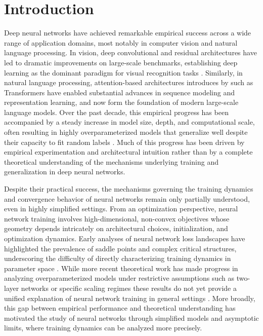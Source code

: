 \chapter{Introduction}\label{cha:intro}

Deep neural networks have achieved remarkable empirical success across a wide
range of application domains, most notably in computer vision and natural
language processing. In vision, deep convolutional and residual architectures
have led to dramatic improvements on large-scale benchmarks, establishing deep
learning as the dominant paradigm for visual recognition tasks
\citep{krizhevsky2012imagenet, he2016deep}. Similarly, in natural language
processing, attention-based architectures introduces by
\citet{vaswani2023attentionneed} such as Transformers have enabled substantial
advances in sequence modeling and representation learning, and now form the
foundation of modern large-scale language models. Over the past decade, this
empirical progress has been accompanied by a steady increase in model size,
depth, and computational scale, often resulting in highly overparameterized
models that generalize well despite their capacity to fit random labels
\citep{zhang2017understandingdeeplearningrequires, Belkin_2019}. Much of this
progress has been driven by empirical experimentation and architectural
intuition rather than by a complete theoretical understanding of the mechanisms
underlying training and generalization in deep neural networks.

Despite their practical success, the mechanisms governing the training dynamics
and convergence behavior of neural networks remain only partially understood,
even in highly simplified settings. From an optimization perspective, neural
network training involves high-dimensional, non-convex objectives whose
geometry depends intricately on architectural choices, initialization, and
optimization dynamics. Early analyses of neural network loss landscapes have
highlighted the prevalence of saddle points and complex critical structures,
underscoring the difficulty of directly characterizing training dynamics in
parameter space \cite{choromanska2015losssurfacesmultilayernetworks}. While
more recent theoretical work has made progress in analyzing overparameterized
models under restrictive assumptions such as two-layer networks or specific
scaling regimes these results do not yet provide a unified explanation of
neural network training in general settings
\cite{arora2019finegrainedanalysisoptimizationgeneralization}. More broadly,
this gap between empirical performance and theoretical understanding has
motivated the study of neural networks through simplified models and asymptotic
limits, where training dynamics can be analyzed more precisely.

